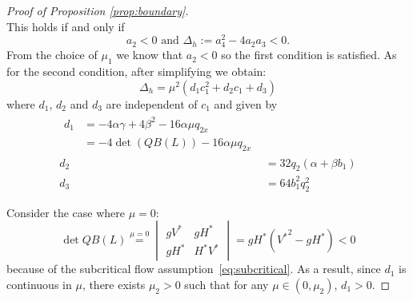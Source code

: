 \documentclass[11pt]{article}
\begin{document}
\begin{proof}[Proof of Proposition \ref{prop:boundary}]
\begin{equation}
    \label{eq:B_neg_a234}
\end{equation}
This holds if and only if
\begin{equation}
a_{2}<0\text{ and } \Delta_h := a_{4}^{2}-4a_{2}a_{3} <0.
\label{eq:young_condition}
\end{equation}
From the choice of ${\mu_1}$ we know that $a_2 < 0$ so the first condition is satisfied. As for the second condition, after simplifying we obtain:
\begin{equation}
    \Delta_h = \mu^2 ( d_1 c_1^2 + d_2 c_1 + d_3 )
\label{eq:poly_d}
\end{equation}
where $d_1$, $d_2$ and $d_3$ are independent of $c_1$ and given by
\begin{align}
\begin{split}
    d_1 &= -4 \alpha \gamma + 4 \beta^2 -16 \alpha \mu  q_{2x} \\
    & = -4 \det (QB(L)) -16 \alpha \mu  q_{2x}
\end{split} \\
    d_2 &= 32 q_2 (\alpha + \beta b_1) \\
    d_3 &= 64 b_1^2 q_2^2
\end{align}

Consider the case where $\mu=0$:
\begin{equation}
    \det QB(L) \stackrel{\mu=0}{=}
    \begin{vmatrix}g{V^{*}} & g{H^{*}} \\ g{H^{*}} & {H^{*}}{V^{*}}\end{vmatrix}
    = g{H^{*}}({V^{*}}^2 - g{H^{*}}) < 0
\end{equation}
because of the subcritical flow assumption~\eqref{eq:subcritical}. As a result, since $d_1$ is continuous in $\mu$, there exists ${\mu_2} > 0$ such that for any $\mu \in (0, {\mu_2})$, $d_1 > 0$.


\end{proof}
\end{document}

